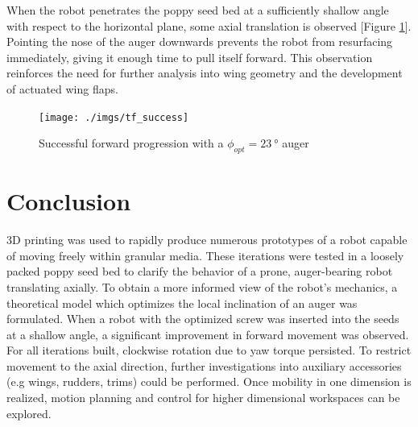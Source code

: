 \documentclass[letterpaper, 11 pt]{article}
\begin{document}
When the robot penetrates the poppy seed bed at a sufficiently shallow angle with respect to the horizontal plane, some axial translation is observed [Figure \ref{fig:tf_success}]. Pointing the nose of the auger downwards prevents the robot from resurfacing immediately, giving it enough time to pull itself forward. This observation reinforces the need for further analysis into wing geometry and the development of actuated wing flaps.   

\begin{figure}[H]
\centering
\texttt{[image: ./imgs/tf\_success]}
\caption{Successful forward progression with a $\phi_{opt} = \SI{23}{\degree}$ auger}
\label{fig:tf_success}
\end{figure}

\section{Conclusion}
3D printing was used to rapidly produce numerous prototypes of a robot capable of moving freely within granular media. These iterations were tested in a loosely packed poppy seed bed to clarify the behavior of a prone, auger-bearing robot translating axially. To obtain a more informed view of the robot's mechanics, a theoretical model  which optimizes the local inclination of an auger was formulated. When a robot with the optimized screw was inserted into the seeds at a shallow angle, a significant improvement in forward movement was observed. For all iterations built, clockwise rotation due to yaw torque persisted. To restrict movement to the axial direction, further investigations into auxiliary accessories (e.g wings, rudders, trims) could be performed. Once mobility in one dimension is realized, motion planning and control for higher dimensional workspaces can be explored.      



\end{document}
